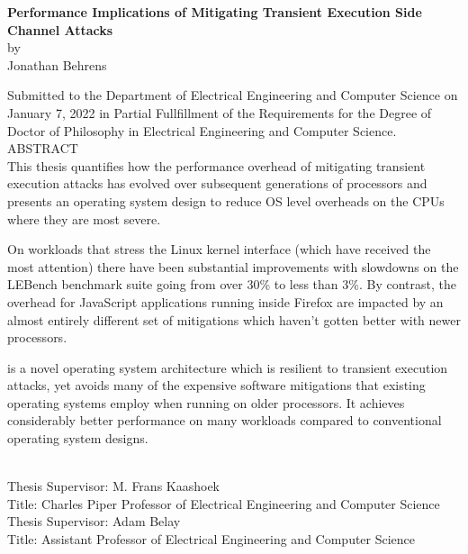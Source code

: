 
\singlespace
\begin{center}

{\large \bf Performance Implications of Mitigating Transient Execution Side Channel Attacks} \\[.5\baselineskip]
by \\
Jonathan Behrens \\[.5\baselineskip]
\end{center}

Submitted to the Department of Electrical Engineering and Computer Science on January 7, 2022 in Partial Fullfillment of the Requirements for the Degree of Doctor of Philosophy in Electrical Engineering and Computer Science.\\[.5\baselineskip]

\noindent
ABSTRACT \\

This thesis quantifies how the performance overhead of mitigating transient execution attacks has evolved over subsequent generations of processors and presents an operating system design to reduce OS level overheads on the CPUs where they are most severe.  

On workloads that stress the Linux kernel interface (which have received the most attention) there have been substantial improvements with slowdowns on the LEBench benchmark suite going from over 30\% to less than 3\%.
By contrast, the overhead for JavaScript applications running inside Firefox are impacted by an almost entirely different set of mitigations which haven't gotten better with newer processors.

\sys is a novel operating system architecture which is resilient to transient execution attacks, yet avoids many of the expensive software mitigations that existing operating systems employ when running on older processors. 
It achieves considerably better performance on many workloads compared to conventional operating system designs.

~\\[\baselineskip]

\noindent
Thesis  Supervisor:  M.  Frans  Kaashoek \\
Title:  Charles  Piper  Professor  of Electrical  Engineering  and  Computer  Science \\[.5\baselineskip]
\noindent
Thesis  Supervisor:  Adam Belay \\
Title:  Assistant Professor  of Electrical  Engineering  and  Computer  Science \\

\doublespace